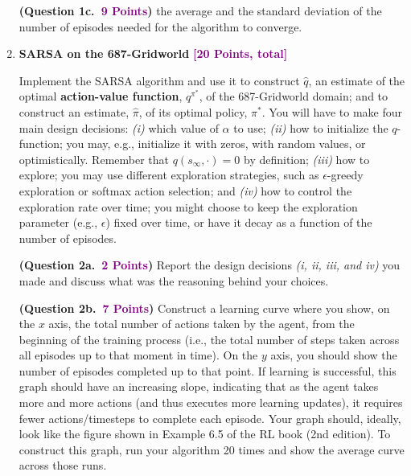 \documentclass{article}
\newcommand{\POINTS}[1]{\textcolor{purple}{\textbf{{#1}}}}
\begin{document}
\begin{enumerate}
        \textbf{(Question 1c.~\POINTS{9 Points})} the average and the standard deviation of the number of episodes needed for the algorithm to converge.
    
    
    
    \vspace{1.25cm}
    \item {\Large{\textbf{SARSA on the 687-Gridworld} \POINTS{[20 Points, total]}}} 
    
    Implement the SARSA algorithm and use it to construct $\hat{q}$, an estimate of the optimal \textbf{action-value function}, $q^{\pi^*}$, of the 687-Gridworld domain; and to construct an estimate, $\hat{\pi}$, of its optimal policy, $\pi^*$. You will have to make four main design decisions: \textit{(i)} which value of $\alpha$ to use; \textit{(ii)} how to initialize the $q$-function; you may, e.g., initialize it with zeros, with random values, or optimistically. Remember that $q(s_\infty, \cdot)=0$ by definition; \textit{(iii)} how to explore; you may use different exploration strategies, such as $\epsilon$-greedy exploration or softmax action selection; and \textit{(iv)} how to control the exploration rate over time; you might choose to keep the exploration parameter (e.g., $\epsilon$) fixed over time, or have it decay as a function of the number of episodes. 
    \vspace{0.3cm}
    
    
        \textbf{(Question 2a.~\POINTS{2 Points})} Report the design decisions \textit{(i, ii, iii, and iv)} you made and discuss what was the reasoning behind your choices.
        
        \textbf{(Question 2b.~\POINTS{7 Points})} Construct a learning curve where you show, on the $x$ axis, the total number of actions taken by the agent, from the beginning of the training process (i.e., the total number of steps taken across all episodes up to that moment in time). On the $y$ axis, you should show the number of episodes completed up to that point. If learning is successful, this graph should have an increasing slope, indicating that as the agent takes more and more actions (and thus executes more learning updates), it requires fewer actions/timesteps to complete each episode. Your graph should, ideally, look like the figure shown in Example 6.5 of the RL book (2nd edition). To construct this graph, run your algorithm 20 times and show the average curve across those runs.
        

\end{enumerate}
\end{document}
